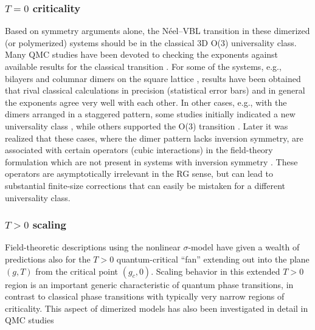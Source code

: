 \documentclass[10pt,pre,aps,twocolumn,showpacs,subscriptaddresses,floatfix]{revtex4}
\begin{document}
\subsubsection{$T=0$ criticality}
Based on symmetry arguments alone, the N\'eel--VBL transition in these dimerized (or polymerized) systems should be in the classical 3D O($3$) 
universality class. Many QMC studies 
have been devoted to checking the exponents against available results for the classical transition \cite{Sandvik94,Troyer96,Matsumoto01,Wang06,Wenzel08,Wenzel09}.
For some of the systems, e.g., bilayers \cite{Wang06} and columnar dimers on the square lattice \cite{Matsumoto01,Wenzel09,Sandvik10b}, results have been 
obtained that rival classical calculations in precision (statistical error bars) and in general the exponents agree very well with each other. In other 
cases, e.g., with the dimers arranged in a staggered pattern, some studies initially indicated a new universality class \cite{Wenzel08}, while others
supported the O($3$) transition \cite{Jiang12}.  Later it was realized that these cases, where the dimer pattern lacks inversion symmetry, are associated 
with certain operators (cubic interactions) in the field-theory formulation  which are not present in systems with inversion symmetry \cite{Fritz11}. 
These operators are asymptotically irrelevant in the RG sense, but can lead to substantial finite-size corrections that can easily be mistaken for a 
different universality class.

\subsubsection{$T>0$ scaling}
Field-theoretic descriptions using the nonlinear $\sigma$-model \cite{Haldane83,Chakravarty89,Chubukov94} have given a wealth of 
predictions also for the $T>0$ quantum-critical ``fan'' extending out into the plane $(g,T)$  from the critical point $(g_c,0)$. Scaling 
behavior in this extended $T>0$ region is an important generic characteristic of quantum phase transitions, in contrast to classical phase transitions 
with typically very narrow regions of criticality. This aspect of dimerized models has also been investigated in detail in QMC 
studies \cite{Sandvik95,Brenig06,Sandvik11a}
\end{document}
